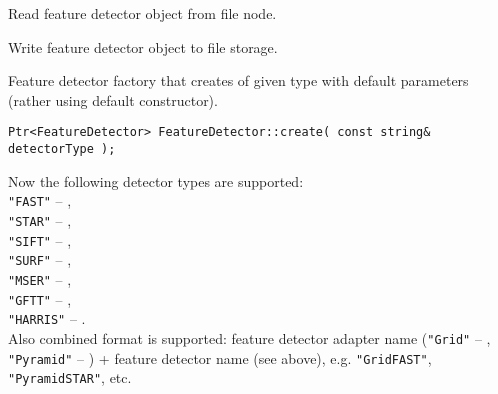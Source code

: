 Read feature detector object from file node.


\begin{description}
\end{description}

Write feature detector object to file storage.


\begin{description}
\end{description}

Feature detector factory that creates  of given type with 
default parameters (rather using default constructor).

\begin{lstlisting}
Ptr<FeatureDetector> FeatureDetector::create( const string& detectorType );
\end{lstlisting}

\begin{description}
\end{description}

Now the following detector types are supported:\\
\texttt{"FAST"} -- ,\\
\texttt{"STAR"} -- ,\\
\texttt{"SIFT"} -- , \\
\texttt{"SURF"} -- , \\
\texttt{"MSER"} -- , \\
\texttt{"GFTT"} -- , \\
\texttt{"HARRIS"} -- . \\
Also combined format is supported: feature detector adapter name (\texttt{"Grid"} -- 
, \texttt{"Pyramid"} -- 
) + feature detector name (see above), 
e.g. \texttt{"GridFAST"}, \texttt{"PyramidSTAR"}, etc.

